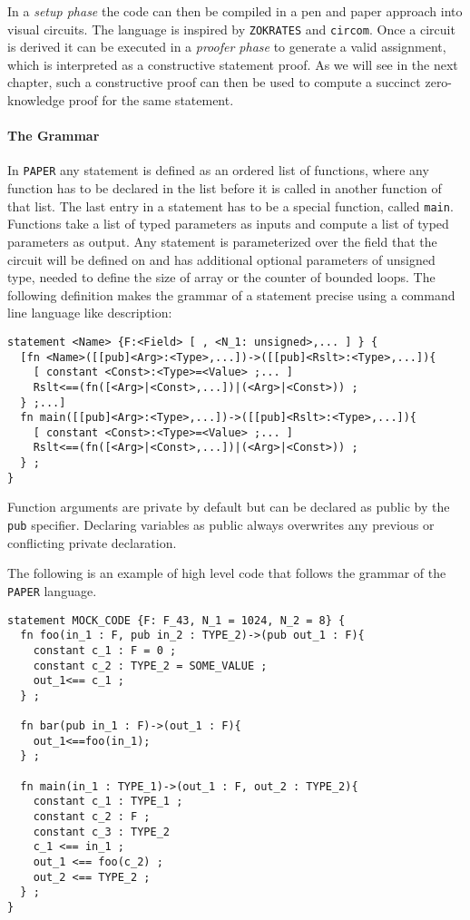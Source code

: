 In a \textit{setup phase} the code can then be compiled in a pen and paper approach into visual circuits. The language is inspired by \texttt{ZOKRATES} and \texttt{circom}. Once a circuit is derived it can be executed in a \textit{proofer phase} to generate a valid assignment, which is interpreted as a constructive statement proof. As we will see in the next chapter, such a constructive proof can then be used to compute a succinct zero-knowledge proof for the same statement. 

\paragraph{The Grammar}
In \texttt{PAPER} any statement is defined as an ordered list of functions, where any function has to be declared in the list before it is called in another function of that list. The last entry in a statement has to be a special function, called \texttt{main}. Functions take a list of typed parameters as inputs and compute a list of typed parameters as output. Any statement is parameterized over the field that the circuit will be defined on and has additional optional parameters of unsigned type, needed to define the size of array or the counter of bounded loops. The following definition makes the grammar of a statement precise using a command line language like description: 
\begin{lstlisting}
statement <Name> {F:<Field> [ , <N_1: unsigned>,... ] } {
  [fn <Name>([[pub]<Arg>:<Type>,...])->([[pub]<Rslt>:<Type>,...]){
    [ constant <Const>:<Type>=<Value> ;... ]
    Rslt<==(fn([<Arg>|<Const>,...])|(<Arg>|<Const>)) ;
  } ;...]
  fn main([[pub]<Arg>:<Type>,...])->([[pub]<Rslt>:<Type>,...]){
    [ constant <Const>:<Type>=<Value> ;... ]
    Rslt<==(fn([<Arg>|<Const>,...])|(<Arg>|<Const>)) ;
  } ;
}
\end{lstlisting}
Function arguments are private by default but can be declared as public by the \texttt{pub} specifier. Declaring variables as public always overwrites any previous or conflicting private declaration. 
\begin{example}The following is an example of high level code that follows the grammar of the \texttt{PAPER} language. 
\begin{lstlisting}
statement MOCK_CODE {F: F_43, N_1 = 1024, N_2 = 8} {
  fn foo(in_1 : F, pub in_2 : TYPE_2)->(pub out_1 : F){
    constant c_1 : F = 0 ;
    constant c_2 : TYPE_2 = SOME_VALUE ;
    out_1<== c_1 ;
  } ;
  
  fn bar(pub in_1 : F)->(out_1 : F){
    out_1<==foo(in_1);
  } ;
    
  fn main(in_1 : TYPE_1)->(out_1 : F, out_2 : TYPE_2){
    constant c_1 : TYPE_1 ;
    constant c_2 : F ;
    constant c_3 : TYPE_2
    c_1 <== in_1 ;
    out_1 <== foo(c_2) ;
    out_2 <== TYPE_2 ;
  } ;
}
\end{lstlisting}
\end{example}
